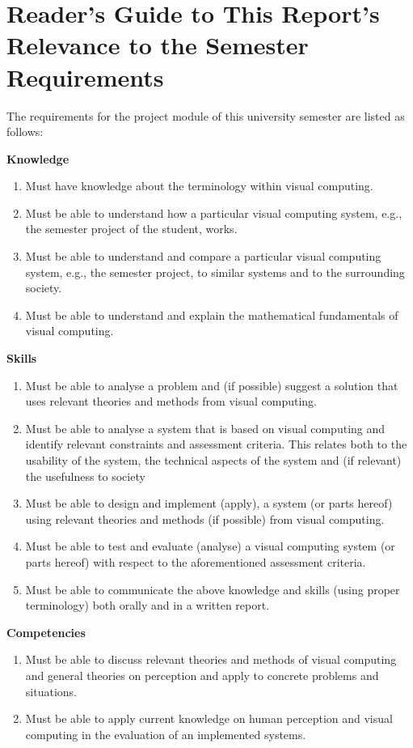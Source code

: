 \chapter{Reader's Guide to This Report's Relevance to the Semester Requirements}\label{app:semesterRequirements}
The requirements for the project module of this university semester are listed as follows:

\textbf{Knowledge}
\begin{enumerate}
\item Must have knowledge about the terminology within visual computing.
\item Must be able to understand how a particular visual computing system, e.g., the semester project of the student, works.
\item Must be able to understand and compare a particular visual computing system, e.g., the semester project, to similar systems and to the surrounding society.
\item Must be able to understand and explain the mathematical fundamentals of visual computing.
\setcounter{enumTemp}{\theenumi}
\end{enumerate}

\textbf{Skills}
\begin{enumerate}
\setcounter{enumi}{\theenumTemp}
\item Must be able to analyse a problem and (if possible) suggest a solution that uses relevant theories and methods from visual computing.
\item Must be able to analyse a system that is based on visual computing and identify relevant constraints and assessment criteria. This relates both to the usability of the system, the technical aspects of the system and (if relevant) the usefulness to society 
\item Must be able to design and implement (apply), a system (or parts hereof) using relevant theories and methods (if possible) from visual computing.
\item Must be able to test and evaluate (analyse) a visual computing system (or parts hereof) with respect to the aforementioned assessment criteria.
\item Must be able to communicate the above knowledge and skills (using proper terminology) both orally and in a written report.
\setcounter{enumTemp}{\theenumi}
\end{enumerate}

\textbf{Competencies}
\begin{enumerate}
\setcounter{enumi}{\theenumTemp}
\item Must be able to discuss relevant theories and methods of visual computing and general theories on perception and apply to concrete problems and situations.
\item Must be able to apply current knowledge on human perception and visual computing in the evaluation of an implemented systems.
\end{enumerate}
\par

